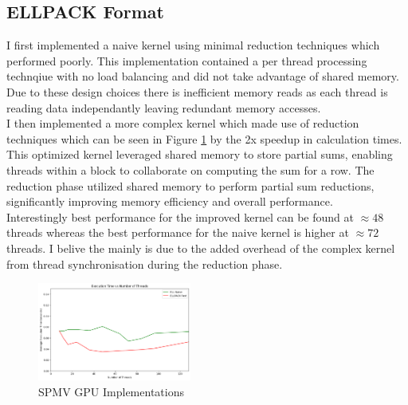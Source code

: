 \documentclass[conference]{IEEEtran}
\begin{document}
\subsection{ELLPACK Format}
I first implemented a naive kernel using minimal reduction techniques which performed poorly. 
This implementation contained a per thread processing technqiue with no load balancing and did not take advantage of shared memory.
Due to these design choices there is inefficient memory reads as each thread is reading data independantly leaving redundant memory accesses. \\
I then implemented a more complex kernel which made use of reduction techniques which can be seen in Figure \ref{fig:zoomed} by the 2x speedup in calculation times.
This optimized kernel leveraged shared memory to store partial sums, enabling threads within a block to collaborate on computing the sum for a row. 
The reduction phase utilized shared memory to perform partial sum reductions, significantly improving memory efficiency and overall performance. \\
Interestingly best performance for the improved kernel can be found at $\approx48$ threads whereas the best performance for the naive kernel is higher at $\approx72$ threads.
I belive the mainly is due to the added overhead of the complex kernel from thread synchronisation during the reduction phase.
\begin{figure}[H]
    \centering
    \includegraphics[width=0.45\textwidth]{../img/ellpackzoomed.png}
    \caption{SPMV GPU Implementations}
    \label{fig:zoomed}
\end{figure}
\end{document}
